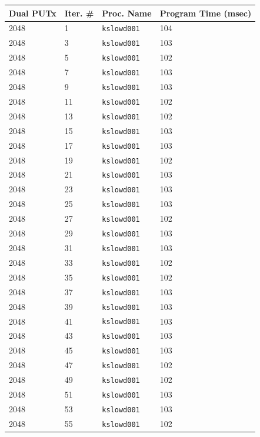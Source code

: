 \documentclass[10pt]{article}
\begin{document}
\begin{table}[htp!]
\centering
{
 \begin{tabular}{|l|l|l|l|} \hline
Dual PUTx & Iter. \# & Proc. Name & Program Time (msec)\\ \hline
2048 & 1 & {\tt kslowd001} & 104 \\ \hline
2048 & 3 & {\tt kslowd001} & 103 \\ \hline
2048 & 5 & {\tt kslowd001} & 102 \\ \hline
2048 & 7 & {\tt kslowd001} & 103 \\ \hline
2048 & 9 & {\tt kslowd001} & 103 \\ \hline
2048 & 11 & {\tt kslowd001} & 102 \\ \hline
2048 & 13 & {\tt kslowd001} & 102 \\ \hline
2048 & 15 & {\tt kslowd001} & 103 \\ \hline
2048 & 17 & {\tt kslowd001} & 103 \\ \hline
2048 & 19 & {\tt kslowd001} & 102 \\ \hline
2048 & 21 & {\tt kslowd001} & 103 \\ \hline
2048 & 23 & {\tt kslowd001} & 103 \\ \hline
2048 & 25 & {\tt kslowd001} & 103 \\ \hline
2048 & 27 & {\tt kslowd001} & 102 \\ \hline
2048 & 29 & {\tt kslowd001} & 103 \\ \hline
2048 & 31 & {\tt kslowd001} & 103 \\ \hline
2048 & 33 & {\tt kslowd001} & 102 \\ \hline
2048 & 35 & {\tt kslowd001} & 102 \\ \hline
2048 & 37 & {\tt kslowd001} & 103 \\ \hline
2048 & 39 & {\tt kslowd001} & 103 \\ \hline
2048 & 41 & {\tt kslowd001} & 103 \\ \hline
2048 & 43 & {\tt kslowd001} & 103 \\ \hline
2048 & 45 & {\tt kslowd001} & 103 \\ \hline
2048 & 47 & {\tt kslowd001} & 102 \\ \hline
2048 & 49 & {\tt kslowd001} & 102 \\ \hline
2048 & 51 & {\tt kslowd001} & 103 \\ \hline
2048 & 53 & {\tt kslowd001} & 103 \\ \hline
2048 & 55 & {\tt kslowd001} & 102 \\ \hline

\end{tabular}}
\end{table}
\end{document}

